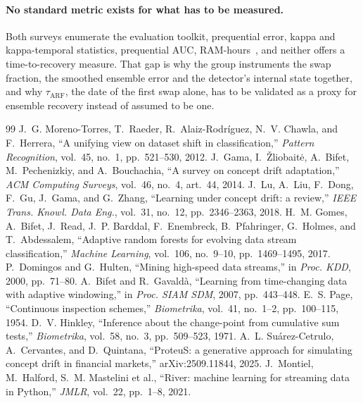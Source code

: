 \documentclass[10pt,a4paper]{article}
\begin{document}
\paragraph{No standard metric exists for what has to be measured.} Both surveys enumerate
the evaluation toolkit, prequential error, kappa and kappa-temporal statistics, prequential
AUC, RAM-hours~\cite{gama2014,lu2018}, and neither offers a time-to-recovery measure. That
gap is why the group instruments the swap fraction, the smoothed ensemble error and the
detector's internal state together, and why $\tau_{\mathrm{ARF}}$, the date of the first
swap alone, has to be validated as a proxy for ensemble recovery instead of assumed to be
one.

\vspace{-0.2em}
{\footnotesize
\begin{thebibliography}{99}\setlength{\itemsep}{0pt}
 J.~G. Moreno-Torres, T.~Raeder, R.~Alaiz-Rodríguez, N.~V. Chawla, and F.~Herrera, ``A unifying view on dataset shift in classification,'' \emph{Pattern Recognition}, vol.~45, no.~1, pp.~521--530, 2012.
 J.~Gama, I.~Žliobaitė, A.~Bifet, M.~Pechenizkiy, and A.~Bouchachia, ``A survey on concept drift adaptation,'' \emph{ACM Computing Surveys}, vol.~46, no.~4, art.~44, 2014.
 J.~Lu, A.~Liu, F.~Dong, F.~Gu, J.~Gama, and G.~Zhang, ``Learning under concept drift: a review,'' \emph{IEEE Trans. Knowl. Data Eng.}, vol.~31, no.~12, pp.~2346--2363, 2018.
 H.~M. Gomes, A.~Bifet, J.~Read, J.~P. Barddal, F.~Enembreck, B.~Pfahringer, G.~Holmes, and T.~Abdessalem, ``Adaptive random forests for evolving data stream classification,'' \emph{Machine Learning}, vol.~106, no.~9--10, pp.~1469--1495, 2017.
 P.~Domingos and G.~Hulten, ``Mining high-speed data streams,'' in \emph{Proc. KDD}, 2000, pp.~71--80.
 A.~Bifet and R.~Gavaldà, ``Learning from time-changing data with adaptive windowing,'' in \emph{Proc. SIAM SDM}, 2007, pp.~443--448.
 E.~S. Page, ``Continuous inspection schemes,'' \emph{Biometrika}, vol.~41, no.~1--2, pp.~100--115, 1954.
 D.~V. Hinkley, ``Inference about the change-point from cumulative sum tests,'' \emph{Biometrika}, vol.~58, no.~3, pp.~509--523, 1971.
 A.~L. Suárez-Cetrulo, A.~Cervantes, and D.~Quintana, ``ProteuS: a generative approach for simulating concept drift in financial markets,'' arXiv:2509.11844, 2025.
 J.~Montiel, M.~Halford, S.~M. Mastelini et al., ``River: machine learning for streaming data in Python,'' \emph{JMLR}, vol.~22, pp.~1--8, 2021.

\end{thebibliography}}
\end{document}
